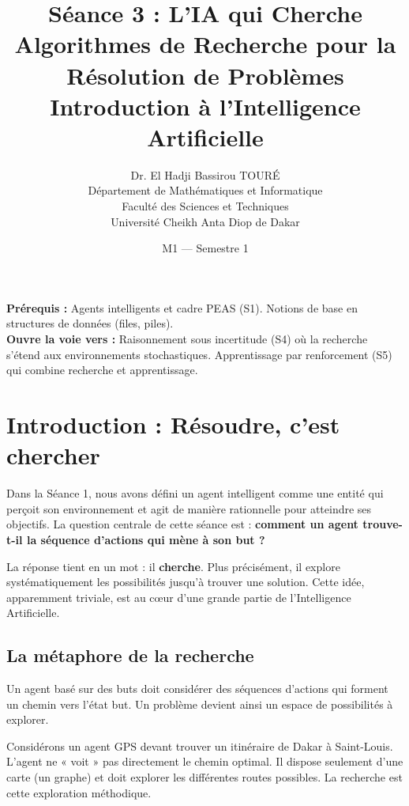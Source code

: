 \documentclass[11pt,a4paper]{article}
\title{\textbf{Séance 3 : L'IA qui Cherche}\\
\large Algorithmes de Recherche pour la Résolution de Problèmes\\[0.5cm]
\normalsize Introduction à l'Intelligence Artificielle}
\author{Dr. El Hadji Bassirou TOURÉ\\
Département de Mathématiques et Informatique\\
Faculté des Sciences et Techniques\\
Université Cheikh Anta Diop de Dakar}
\date{M1 --- Semestre 1}
\begin{document}
\maketitle

\begin{prereqbox}
\textbf{Prérequis :} Agents intelligents et cadre PEAS (S1). Notions de base en structures de données (files, piles).\\
\textbf{Ouvre la voie vers :} Raisonnement sous incertitude (S4) où la recherche s'étend aux environnements stochastiques. Apprentissage par renforcement (S5) qui combine recherche et apprentissage.
\end{prereqbox}

\vspace{0.5cm}

\tableofcontents

\newpage

\section{Introduction : Résoudre, c'est chercher}

Dans la Séance 1, nous avons défini un agent intelligent comme une entité qui perçoit son environnement et agit de manière rationnelle pour atteindre ses objectifs. La question centrale de cette séance est : \textbf{comment un agent trouve-t-il la séquence d'actions qui mène à son but ?}

La réponse tient en un mot : il \textbf{cherche}. Plus précisément, il explore systématiquement les possibilités jusqu'à trouver une solution. Cette idée, apparemment triviale, est au cœur d'une grande partie de l'Intelligence Artificielle.

\subsection{La métaphore de la recherche}

Un agent basé sur des buts doit considérer des séquences d'actions qui forment un chemin vers l'état but. Un problème devient ainsi un espace de possibilités à explorer.

Considérons un agent GPS devant trouver un itinéraire de Dakar à Saint-Louis. L'agent ne « voit » pas directement le chemin optimal. Il dispose seulement d'une carte (un graphe) et doit explorer les différentes routes possibles. La recherche est cette exploration méthodique.
\end{document}
